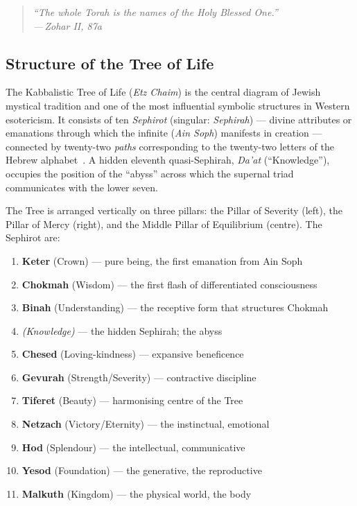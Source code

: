 \documentclass[12pt, a4paper]{article}
\newcommand{\epigraph}[2]{%
  \begin{quote}
    \itshape ``#1''\\[0.3em]
    \normalfont\small\hfill ---\,#2
  \end{quote}
}
\begin{document}
\epigraph{The whole Torah is the names of the Holy Blessed One.}{Zohar II,
87a}

\subsection{Structure of the Tree of Life}

The Kabbalistic Tree of Life (\emph{Etz Chaim}) is the central diagram of
Jewish mystical tradition and one of the most influential symbolic structures
in Western esotericism. It consists of ten \emph{Sephirot} (singular:
\emph{Sephirah}) — divine attributes or emanations through which the infinite
(\emph{Ain Soph}) manifests in creation — connected by twenty-two
\emph{paths} corresponding to the twenty-two letters of the Hebrew
alphabet~\autocite[106]{scholem1974}. A hidden eleventh quasi-Sephirah,
\emph{Da'at} (``Knowledge''), occupies the position of the ``abyss'' across
which the supernal triad communicates with the lower seven.

The Tree is arranged vertically on three pillars: the Pillar of Severity
(left), the Pillar of Mercy (right), and the Middle Pillar of Equilibrium
(centre). The Sephirot are:

\begin{enumerate}[leftmargin=2cm]
  \item \textbf{Keter} (Crown) — pure being, the first emanation from Ain Soph
  \item \textbf{Chokmah} (Wisdom) — the first flash of differentiated consciousness
  \item \textbf{Binah} (Understanding) — the receptive form that structures Chokmah
  \item[\textit{(Da'at)}] \textit{(Knowledge)} — the hidden Sephirah; the abyss
  \item \textbf{Chesed} (Loving-kindness) — expansive beneficence
  \item \textbf{Gevurah} (Strength/Severity) — contractive discipline
  \item \textbf{Tiferet} (Beauty) — harmonising centre of the Tree
  \item \textbf{Netzach} (Victory/Eternity) — the instinctual, emotional
  \item \textbf{Hod} (Splendour) — the intellectual, communicative
  \item \textbf{Yesod} (Foundation) — the generative, the reproductive
  \item \textbf{Malkuth} (Kingdom) — the physical world, the body
\end{enumerate}
\end{document}
